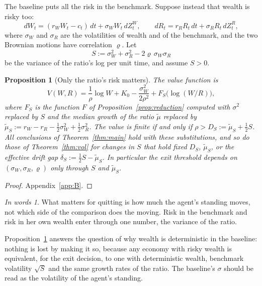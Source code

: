 \documentclass[12pt]{article}
\newtheorem{proposition}{Proposition}
\theoremstyle{definition}
\theoremstyle{remark}
\newtheorem*{inwords}{In words}
\newcommand{\mut}{\tilde\mu}
\theoremstyle{plain}
\theoremstyle{definition}
\begin{document}
The baseline puts all the risk in the benchmark. Suppose instead that wealth is risky too:
\[
dW_t=(r_WW_t-c_t)\,dt+\sigma_WW_t\,dZ^W_t,\qquad dR_t=r_RR_t\,dt+\sigma_RR_t\,dZ^R_t,
\]
where $\sigma_W$ and $\sigma_R$ are the volatilities of wealth and of the benchmark, and the two Brownian motions have correlation $\varrho$. Let
\[
S:=\sigma_W^2+\sigma_R^2-2\varrho\,\sigma_W\sigma_R
\]
be the variance of the ratio's log per unit time, and assume $S>0$.

\begin{proposition}[Only the ratio's risk matters]\label{prop:wealth}
The value function is
\[
V(W,R)=\frac1\rho\log W+K_0-\frac{\sigma_W^2}{2\rho^2}+F_S\big(\log(W/R)\big),
\]
where $F_S$ is the function $F$ of Proposition~\ref{prop:reduction} computed with $\sigma^2$ replaced by $S$ and the median growth of the ratio $\mut$ replaced by $\mut_S:=r_W-r_R-\tfrac12\sigma_W^2+\tfrac12\sigma_R^2$. The value is finite if and only if $\rho>D_S:=\mut_S+\tfrac12S$. All conclusions of Theorem~\ref{thm:main} hold with these substitutions, and so do those of Theorem~\ref{thm:vol} for changes in $S$ that hold fixed $D_S$, $\mut_S$, or the effective drift gap $\delta_S:=\tfrac12S-\mut_S$. In particular the exit threshold depends on $(\sigma_W,\sigma_R,\varrho)$ only through $S$ and $\mut_S$.
\end{proposition}

\begin{proof}
Appendix~\ref{app:B}.
\end{proof}

\begin{inwords}
What matters for quitting is how much the agent's standing moves, not which side of the comparison does the moving. Risk in the benchmark and risk in her own wealth enter through one number, the variance of the ratio.
\end{inwords}

Proposition~\ref{prop:wealth} answers the question of why wealth is deterministic in the baseline: nothing is lost by making it so, because any economy with risky wealth is equivalent, for the exit decision, to one with deterministic wealth, benchmark volatility $\sqrt S$ and the same growth rates of the ratio. The baseline's $\sigma$ should be read as the volatility of the agent's standing.
\end{document}
